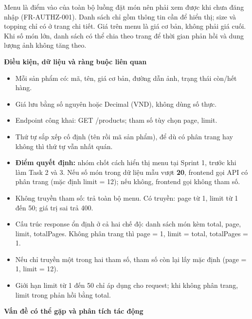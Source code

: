 \documentclass[11pt,a4paper,oneside]{report}
\begin{document}
Menu là điểm vào của toàn bộ luồng đặt món nên phải xem được khi chưa đăng nhập (FR-AUTHZ-001). Danh sách chỉ gồm thông tin cần để hiển thị; size và topping chỉ có ở trang chi tiết. Giá trên menu là giá cơ bản, không phải giá cuối. Khi số món lớn, danh sách có thể chia theo trang để thời gian phản hồi và dung lượng ảnh không tăng theo.

\textbf{Điều kiện, dữ liệu và ràng buộc liên quan}

\begin{itemize}
\item
  Mỗi sản phẩm có: mã, tên, giá cơ bản, đường dẫn ảnh, trạng thái còn/hết hàng.
\item
  Giá lưu bằng số nguyên hoặc Decimal (VND), không dùng số thực.
\item
  Endpoint công khai: GET /products; tham số tùy chọn page, limit.
\item
  Thứ tự sắp xếp cố định (tên rồi mã sản phẩm), để dù có phân trang hay không thì thứ tự vẫn nhất quán.
\item
  \textbf{Điểm quyết định:} nhóm chốt cách hiển thị menu tại Sprint 1, trước khi làm Task 2 và 3. Nếu số món trong dữ liệu mẫu vượt \textbf{20}, frontend gọi API có phân trang (mặc định limit = 12); nếu không, frontend gọi không tham số.
\item
  Không truyền tham số: trả toàn bộ menu. Có truyền: page từ 1, limit từ 1 đến 50; giá trị sai trả 400.
\item
  Cấu trúc response ổn định ở cả hai chế độ: danh sách món kèm total, page, limit, totalPages. Không phân trang thì page = 1, limit = total, totalPages = 1.
\item
  Nếu chỉ truyền một trong hai tham số, tham số còn lại lấy mặc định (page = 1, limit = 12).
\item
  Giới hạn limit từ 1 đến 50 chỉ áp dụng cho request; khi không phân trang, limit trong phản hồi bằng total.
\end{itemize}

\textbf{Vấn đề có thể gặp và phân tích tác động}
\end{document}
